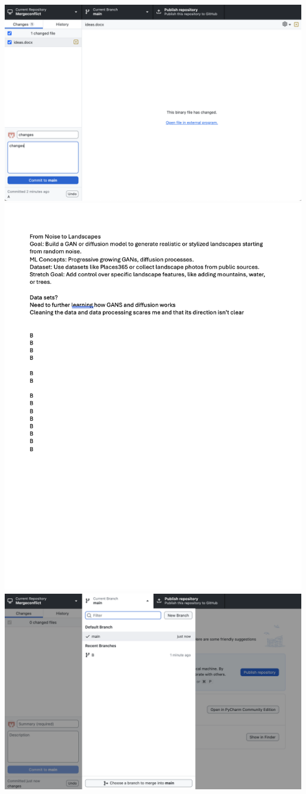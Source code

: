 \documentclass[10pt,twocolumn]{article}
\begin{document}
\begin{enumerate}
\includegraphics[width=\linewidth]{15.png}
\includegraphics[width=\linewidth]{16.png}
\includegraphics[width=\linewidth]{17.png}

\end{enumerate}
\end{document}
